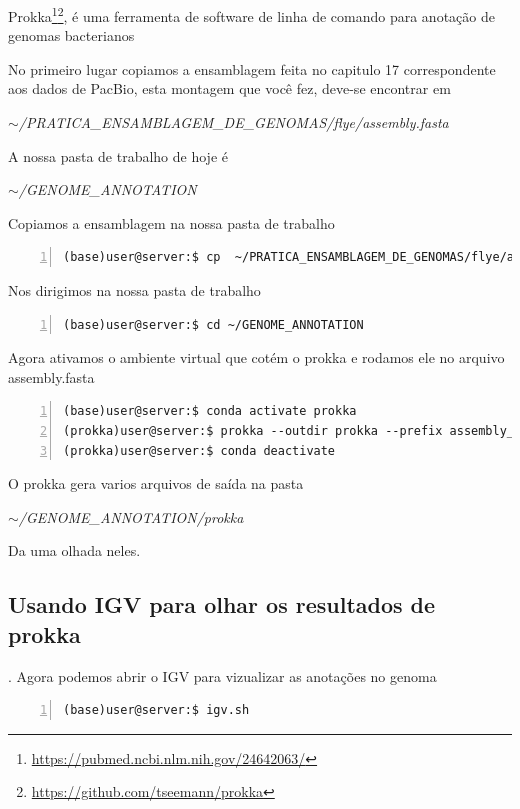 \documentclass[letter,11pt]{book}
\begin{document}
Prokka\footnote{\url{https://pubmed.ncbi.nlm.nih.gov/24642063/}}\footnote{\url{https://github.com/tseemann/prokka}}, é uma ferramenta de software de linha de comando para anotação de genomas bacterianos

No primeiro lugar copiamos a ensamblagem feita no capitulo 17 correspondente aos dados de PacBio, esta montagem que você fez, deve-se encontrar em

\emph{$\sim$/PRATICA\_ENSAMBLAGEM\_DE\_GENOMAS/flye/assembly.fasta}

A nossa pasta de trabalho de hoje é

\emph{$\sim$/GENOME\_ANNOTATION}

Copiamos a ensamblagem na nossa pasta de trabalho

\begin{Verbatim}[commandchars=!\{\}, numbers=left,label= Copiando a ensamblagem para sua anotação,frame=topline,fontsize=\scriptsize]
(base)user@server:$ cp  ~/PRATICA_ENSAMBLAGEM_DE_GENOMAS/flye/assembly.fasta ~/GENOME_ANNOTATION
\end{Verbatim}

Nos dirigimos na nossa pasta de trabalho

\begin{Verbatim}[commandchars=!\{\}, numbers=left,label= Indo na pasta de trabalho,frame=topline,fontsize=\scriptsize]
(base)user@server:$ cd ~/GENOME_ANNOTATION
\end{Verbatim}

Agora ativamos o ambiente virtual que cotém o prokka e rodamos ele no arquivo assembly.fasta

\begin{Verbatim}[commandchars=!\{\}, numbers=left,label= Rodando prokka ,frame=topline,fontsize=\scriptsize]
(base)user@server:$ conda activate prokka
(prokka)user@server:$ prokka --outdir prokka --prefix assembly_pacbio assembly.fasta --force
(prokka)user@server:$ conda deactivate
\end{Verbatim}

O prokka gera varios arquivos de saída na pasta

\emph{$\sim$/GENOME\_ANNOTATION/prokka}

Da uma olhada neles.

\subsection{Usando IGV para olhar os resultados de prokka}.
Agora podemos abrir o IGV para vizualizar as anotações no genoma
\begin{Verbatim}[commandchars=!\{\}, numbers=left,label= Abrindo IGV,frame=topline,fontsize=\scriptsize]
(base)user@server:$ igv.sh
\end{Verbatim}
\end{document}
